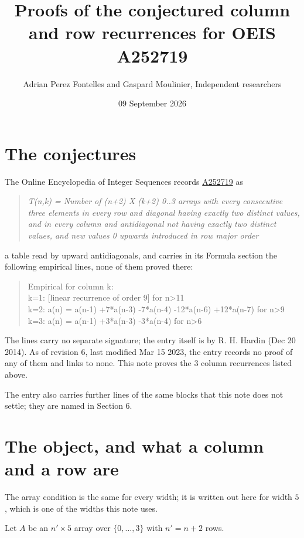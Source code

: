 \documentclass[11pt]{article}
\title{Proofs of the conjectured column and row recurrences for OEIS A252719}
\author{Adrian Perez Fontelles and Gaspard Moulinier, Independent researchers}
\date{09 September 2026}
\theoremstyle{definition}
\begin{document}
\maketitle
\section{The conjectures}

The Online Encyclopedia of Integer Sequences records \href{https://oeis.org/A252719}{A252719} as

\begin{quote}\itshape T(n,k) = Number of (n+2) X (k+2) 0..3 arrays with every consecutive three elements in every row and diagonal having exactly two distinct values, and in every column and antidiagonal not having exactly two distinct values, and new values 0 upwards introduced in row major order\end{quote}

a table read by upward antidiagonals, and carries in its Formula section the following empirical lines, none of them proved there:

\begin{quote}\ttfamily Empirical for column k:\\
k=1: [linear recurrence of order 9] for n>11\\k=2: a(n) = a(n-1) +7*a(n-3) -7*a(n-4) -12*a(n-6) +12*a(n-7) for n>9\\k=3: a(n) = a(n-1) +3*a(n-3) -3*a(n-4) for n>6\end{quote}

The lines carry no separate signature; the entry itself is by R. H. Hardin (Dec 20 2014). As of revision 6, last modified Mar 15 2023, the entry records no proof of any of them and links to none. This note proves the 3 column recurrences listed above.

The entry also carries further lines of the same blocks that this note does not settle; they are named in Section 6.

\section{The object, and what a column and a row are}

The array condition is the same for every width; it is written out here for width $5$, which is one of the widths this note uses.

Let $A$ be an $n' \times 5$ array over $\{0,\dots,3\}$ with $n' = n + 2$ rows.
\end{document}

